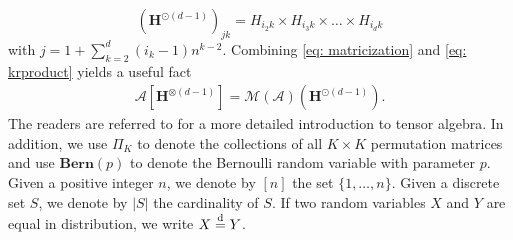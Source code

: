 \documentclass{article}
\theoremstyle{plain}
\theoremstyle{definition}
\theoremstyle{remark}
\newcommand{\MCal}{\mathcal{M}}
\newcommand{\ACal}{\mathcal{A}}
\begin{document}
\begin{equation}\label{eq: krproduct}
	\left( \bm{H}^{\odot (d-1)} \right)_{jk} = H_{i_2k} \times H_{i_{3}k} \times \dots \times H_{i_dk} 
\end{equation}
with $j = 1 + \sum_{k=2}^d (i_k-1)n^{k-2}$.
Combining \eqref{eq: matricization} and \eqref{eq: krproduct} yields a useful fact 
\begin{align} \label{eq: grad-two-eq-expression}
	\ACal\left[{\bm{H}}^{\otimes (d-1)}\right] = \MCal(\ACal) \left( \bm{H}^{\odot (d-1)} \right).
\end{align}
The readers are referred to \citet{kolda2009tensor,sidiropoulos2017tensor,cichocki2016tensor} for a more detailed introduction to tensor algebra. In addition, we use $\Pi_K$ to denote the collections of all $K \times K$ permutation matrices and use $\mathbf{Bern}(p)$ to denote the Bernoulli random variable with parameter $p$. Given a positive integer $n$, we denote by $[n]$ the set $\{1,\dots,n\}$. Given a discrete set $S$, we denote by $|S|$ the cardinality of $S$. If two random variables $X$ and $Y$ are equal in distribution, we write $X \overset{\textnormal{d}}{=}
Y$.  
\end{document}
